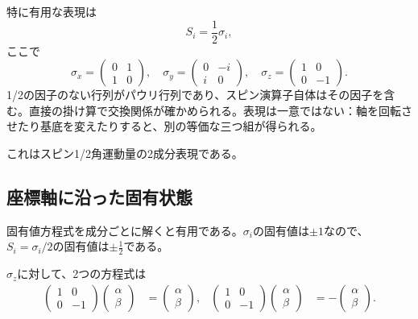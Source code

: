 特に有用な表現は
\begin{equation}
S_i=\frac12\sigma_i,
\end{equation}
ここで
\begin{equation}
\sigma_x=
\begin{pmatrix}
0&1\\
1&0
\end{pmatrix},
\quad
\sigma_y=
\begin{pmatrix}
0&-i\\
i&0
\end{pmatrix},
\quad
\sigma_z=
\begin{pmatrix}
1&0\\
0&-1
\end{pmatrix}.
\end{equation}
1/2の因子のない行列がパウリ行列であり、スピン演算子自体はその因子を含む。直接の掛け算で交換関係が確かめられる。表現は一意ではない：軸を回転させたり基底を変えたりすると、別の等価な三つ組が得られる。

これはスピン1/2角運動量の2成分表現である。

\subsection{座標軸に沿った固有状態}

固有値方程式を成分ごとに解くと有用である。\(\sigma_i\)の固有値は\(\pm1\)なので、\(S_i=\sigma_i/2\)の固有値は\(\pm\tfrac12\)である。

\(\sigma_z\)に対して、2つの方程式は
\begin{align}
\begin{pmatrix}
1&0\\
0&-1
\end{pmatrix}
\begin{pmatrix}
\alpha\\
\beta
\end{pmatrix}
&=
\begin{pmatrix}
\alpha\\
\beta
\end{pmatrix},
&
\begin{pmatrix}
1&0\\
0&-1
\end{pmatrix}
\begin{pmatrix}
\alpha\\
\beta
\end{pmatrix}
&=
-
\begin{pmatrix}
\alpha\\
\beta
\end{pmatrix}.
\end{align}

